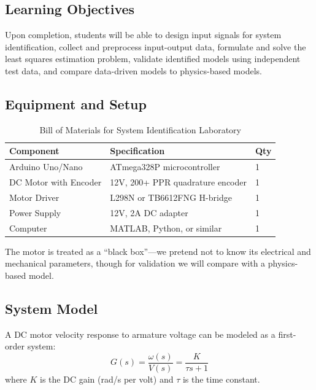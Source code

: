 \subsection{Learning Objectives}

Upon completion, students will be able to design input signals for system identification, collect and preprocess input-output data, formulate and solve the least squares estimation problem, validate identified models using independent test data, and compare data-driven models to physics-based models.

\subsection{Equipment and Setup}

\begin{table}[htbp]
\centering
\caption{Bill of Materials for System Identification Laboratory}
\label{tab:sysid_bom}
\begin{tabular}{lll}
\toprule
\textbf{Component} & \textbf{Specification} & \textbf{Qty} \\
\midrule
Arduino Uno/Nano & ATmega328P microcontroller & 1 \\
DC Motor with Encoder & 12V, 200+ PPR quadrature encoder & 1 \\
Motor Driver & L298N or TB6612FNG H-bridge & 1 \\
Power Supply & 12V, 2A DC adapter & 1 \\
Computer & MATLAB, Python, or similar & 1 \\
\bottomrule
\end{tabular}
\end{table}

The motor is treated as a ``black box''---we pretend not to know its electrical and mechanical parameters, though for validation we will compare with a physics-based model.

\subsection{System Model}

A DC motor velocity response to armature voltage can be modeled as a first-order system:
\begin{equation}
G(s) = \frac{\omega(s)}{V(s)} = \frac{K}{\tau s + 1}
\label{eq:motor_first_order}
\end{equation}
where $K$ is the DC gain (rad/s per volt) and $\tau$ is the time constant.

